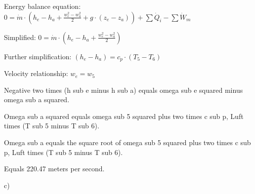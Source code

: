 Energy balance equation:  
\( 0 = \dot{m} \cdot \left( h_e - h_a + \frac{w_e^2 - w_a^2}{2} + g \cdot (z_e - z_a) \right) + \sum \dot{Q}_i - \sum \dot{W}_m \)  

Simplified:  
\( 0 = \dot{m} \cdot \left( h_e - h_a + \frac{w_e^2 - w_a^2}{2} \right) \)  

Further simplification:  
\( (h_e - h_a) = c_p \cdot (T_5 - T_6) \)  

Velocity relationship:  
\( w_e = w_5 \)

Negative two times (h sub e minus h sub a) equals omega sub e squared minus omega sub a squared.  

Omega sub a squared equals omega sub 5 squared plus two times c sub p, Luft times (T sub 5 minus T sub 6).  

Omega sub a equals the square root of omega sub 5 squared plus two times c sub p, Luft times (T sub 5 minus T sub 6).  

Equals 220.47 meters per second.  

c)